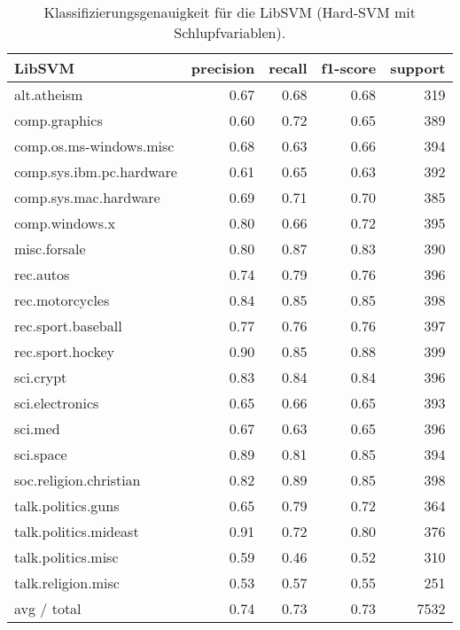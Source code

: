 \begin{table}[h!]
\centering
\begin{tabular}{|l | r | r | r | r|}
\hline
LibSVM                         & precision  &  recall &  f1-score &   support \\
\hline
             alt.atheism       & 0.67      & 0.68      & 0.68      & 319  \\
           comp.graphics       & 0.60      & 0.72      & 0.65      & 389 \\
 comp.os.ms-windows.misc       & 0.68      & 0.63      & 0.66      & 394 \\
comp.sys.ibm.pc.hardware       & 0.61      & 0.65      & 0.63      & 392 \\
   comp.sys.mac.hardware       & 0.69      & 0.71      & 0.70      & 385 \\
          comp.windows.x       & 0.80      & 0.66      & 0.72      & 395 \\
            misc.forsale       & 0.80      & 0.87      & 0.83      & 390 \\
               rec.autos       & 0.74      & 0.79      & 0.76      & 396 \\
         rec.motorcycles       & 0.84      & 0.85      & 0.85      & 398 \\
      rec.sport.baseball       & 0.77      & 0.76      & 0.76      & 397 \\
        rec.sport.hockey       & 0.90      & 0.85      & 0.88      & 399 \\
               sci.crypt       & 0.83      & 0.84      & 0.84      & 396 \\
         sci.electronics       & 0.65      & 0.66      & 0.65      & 393 \\
                 sci.med       & 0.67      & 0.63      & 0.65      & 396 \\
               sci.space       & 0.89      & 0.81      & 0.85      & 394 \\
  soc.religion.christian       & 0.82      & 0.89      & 0.85      & 398 \\
      talk.politics.guns       & 0.65      & 0.79      & 0.72      & 364 \\
   talk.politics.mideast       & 0.91      & 0.72      & 0.80      & 376 \\
      talk.politics.misc       & 0.59      & 0.46      & 0.52      & 310 \\
      talk.religion.misc       & 0.53      & 0.57      & 0.55      & 251 \\
\hline
              avg / total      & 0.74      & 0.73      & 0.73      &7532 \\
\hline			 
\end{tabular}
\caption{Klassifizierungsgenauigkeit für die LibSVM (Hard-SVM mit Schlupfvariablen).}
\label{tab:LibSVM}
\end{table}